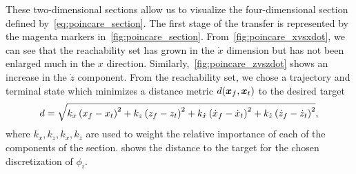 \documentclass[]{aiaa-tc}%
\begin{document}
These two-dimensional sections allow us to visualize the four-dimensional \Poincare section defined by~\cref{eq:poincare_section}.
The first stage of the transfer is represented by the magenta markers in~\cref{fig:poincare_section}.
From~\cref{fig:poincare_xvsxdot}, we can see that the reachability set has grown in the \( \dot{x} \) dimension but has not been enlarged much in the \( x \) direction.
Similarly,~\cref{fig:poincare_zvszdot} shows an increase in the \( \dot{z} \) component.
From the reachability set, we chose a trajectory and terminal state which minimizes a distance metric \( d(\bm{x}_f,\bm{x}_t) \) to the desired target
\begin{align}\label{eq:reach_dist}
    d = \sqrt{k_x \left( x_f - x_t  \right)^2 + k_z \left( z_f - z_t  \right)^2 + k_{\dot{x}}\left( \dot{x}_f - \dot{x}_t  \right)^2 + k_{\dot{z}}\left( \dot{z}_f - \dot{z}_t  \right)^2} ,
\end{align}
where \( k_x, k_z, k_{\dot{x}}, k_{\dot{z}} \) are used to weight the relative importance of each of the components of the \Poincare section.
 shows the distance to the target for the chosen discretization of \( \phi_i \).
\end{document}
